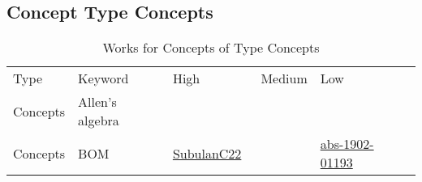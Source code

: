 \clearpage
\subsection{Concept Type Concepts}
\label{sec:Concepts}
{\scriptsize
\begin{longtable}{lp{3cm}>{\raggedright\arraybackslash}p{6cm}>{\raggedright\arraybackslash}p{6cm}>{\raggedright\arraybackslash}p{8cm}}
\rowcolor{white}\caption{Works for Concepts of Type Concepts}\\ \toprule
\rowcolor{white}Type & Keyword & High & Medium & Low\\ \midrule\endhead
\bottomrule
\endfoot
Concepts & Allen's algebra &  &  & \\
Concepts & BOM & \href{works/SubulanC22.pdf}{SubulanC22}~\cite{SubulanC22} &  & \href{works/abs-1902-01193.pdf}{abs-1902-01193}~\cite{abs-1902-01193}\\

\end{longtable}}
